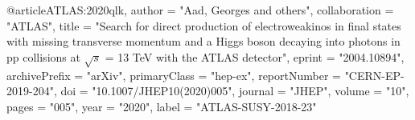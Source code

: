 @article{ATLAS:2020qlk,
    author = "Aad, Georges and others",
    collaboration = "ATLAS",
    title = "{Search for direct production of electroweakinos in final states with missing transverse momentum and a Higgs boson decaying into photons in pp collisions at $ \sqrt{s} $ = 13 TeV with the ATLAS detector}",
    eprint = "2004.10894",
    archivePrefix = "arXiv",
    primaryClass = "hep-ex",
    reportNumber = "CERN-EP-2019-204",
    doi = "10.1007/JHEP10(2020)005",
    journal = "JHEP",
    volume = "10",
    pages = "005",
    year = "2020",
    label = "ATLAS-SUSY-2018-23"
}

